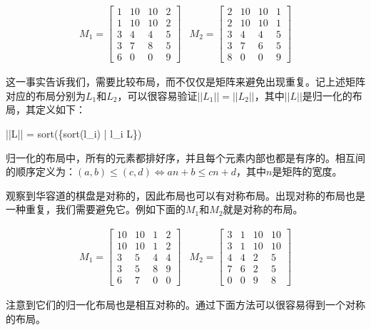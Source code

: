 \documentclass[UTF8]{article}
\begin{document}
\[
\begin{array}{cc}
M_1 = \left [
  \begin{array}{cccc}
  1 & 10 & 10 & 2 \\
  1 & 10 & 10 & 2 \\
  3 & 4 & 4 & 5 \\
  3 & 7 & 8 & 5 \\
  6 & 0 & 0 & 9
  \end{array}
\right ] &
M_2 = \left [
  \begin{array}{cccc}
  2 & 10 & 10 & 1 \\
  2 & 10 & 10 & 1 \\
  3 & 4 & 4 & 5 \\
  3 & 7 & 6 & 5 \\
  8 & 0 & 0 & 9
  \end{array}
\right ]
\end{array}
\]

这一事实告诉我们，需要比较布局，而不仅仅是矩阵来避免出现重复。记上述矩阵对应的布局分别为$L_1$和$L_2$，可以很容易验证$||L_1|| = ||L_2||$，其中$||L||$是归一化的布局，其定义如下：

\be
||L|| = sort(\{sort(l_i) | \forall l_i \in L\})
\ee

归一化的布局中，所有的元素都排好序，并且每个元素内部也都是有序的。相互间的顺序定义为：$(a, b) \leq (c, d) \Leftrightarrow a n + b \leq c n + d$，其中$n$是矩阵的宽度。

观察到华容道的棋盘是对称的，因此布局也可以有对称布局。出现对称的布局也是一种重复，我们需要避免它。例如下面的$M_1$和$M_2$就是对称的布局。

\[
\begin{array}{cc}
M_1 = \left [
  \begin{array}{cccc}
  10 & 10 & 1 & 2 \\
  10 & 10 & 1 & 2 \\
  3 & 5 & 4 & 4 \\
  3 & 5 & 8 & 9 \\
  6 & 7 & 0 & 0
  \end{array}
\right ] &
M_2 = \left [
  \begin{array}{cccc}
  3 & 1 & 10 & 10 \\
  3 & 1 & 10 & 10 \\
  4 & 4 & 2 & 5 \\
  7 & 6 & 2 & 5 \\
  0 & 0 & 9 & 8
  \end{array}
\right ]
\end{array}
\]

注意到它们的归一化布局也是相互对称的。通过下面方法可以很容易得到一个对称的布局。
\end{document}
